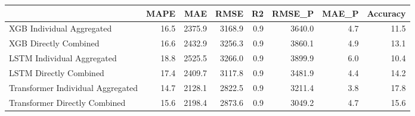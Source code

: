 \begin{tabular}{lrrrrrrr}
\toprule
{} &  MAPE &    MAE &   RMSE &  R2 &  RMSE\_P &  MAE\_P &  Accuracy \\
\midrule
XGB Individual Aggregated         &  16.5 & 2375.9 & 3168.9 & 0.9 &  3640.0 &    4.7 &      11.5 \\
XGB Directly Combined             &  16.6 & 2432.9 & 3256.3 & 0.9 &  3860.1 &    4.9 &      13.1 \\
LSTM Individual Aggregated        &  18.8 & 2525.5 & 3266.0 & 0.9 &  3899.9 &    6.0 &      10.4 \\
LSTM Directly Combined            &  17.4 & 2409.7 & 3117.8 & 0.9 &  3481.9 &    4.4 &      14.2 \\
Transformer Individual Aggregated &  14.7 & 2128.1 & 2822.5 & 0.9 &  3211.4 &    3.8 &      17.8 \\
Transformer Directly Combined     &  15.6 & 2198.4 & 2873.6 & 0.9 &  3049.2 &    4.7 &      15.6 \\
\bottomrule
\end{tabular}
